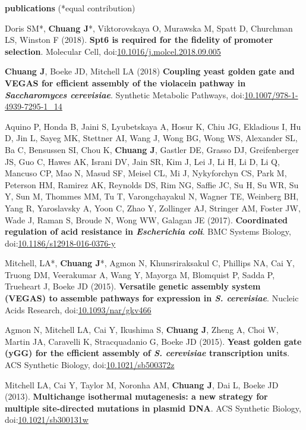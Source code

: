 \documentclass[11pt, a4paper]{article}
\begin{document}
\vspace{2em}
\textbf{\Large publications} (*equal contribution)
\begin{description}[topsep=2pt, align=right, leftmargin=!, labelwidth=\widthof{\textbf{2018}}]
    \item [2018] Doris SM*, \textbf{Chuang J}*, Viktorovskaya O, Murawska M, Spatt D, Churchman LS, Winston F (2018). \textbf{Spt6 is required for the fidelity of promoter selection}. Molecular Cell, doi:\href{https://doi.org/10.1016/j.molcel.2018.09.005}{10.1016/j.molcel.2018.09.005}
    \item [2018] \textbf{Chuang J}, Boeke JD, Mitchell LA (2018) \textbf{Coupling yeast golden gate and VEGAS for efficient assembly of the violacein pathway in \textit{Saccharomyces cerevisiae}}. Synthetic Metabolic Pathways, doi:\href{https://doi.org/10.1007/978-1-4939-7295-1_14}{10.1007/978-1-4939-7295-1\_14}
    \item [2017] Aquino P, Honda B, Jaini S, Lyubetskaya A, Hosur K, Chiu JG, Ekladious I, Hu D, Jin L, Sayeg MK, Stettner AI, Wang J, Wong BG, Wong WS, Alexander SL, Ba C, Bensussen SI, Chou K, \textbf{Chuang J}, Gastler DE, Grasso DJ, Greifenberger JS, Guo C, Hawes AK, Israni DV, Jain SR, Kim J, Lei J, Li H, Li D, Li Q, Mancuso CP, Mao N, Masud SF, Meisel CL, Mi J, Nykyforchyn CS, Park M, Peterson HM, Ramirez AK, Reynolds DS, Rim NG, Saffie JC, Su H, Su WR, Su Y, Sun M, Thommes MM, Tu T, Varongchayakul N, Wagner TE, Weinberg BH, Yang R, Yaroslavsky A, Yoon C, Zhao Y, Zollinger AJ, Stringer AM, Foster JW, Wade J, Raman S, Broude N, Wong WW, Galagan JE (2017). \textbf{Coordinated regulation of acid resistance in \textit{Escherichia coli}}. BMC Systems Biology, doi:\href{https://doi.org/10.1186/s12918-016-0376-y}{10.1186/s12918-016-0376-y}
    \item [2015] Mitchell, LA*, \textbf{Chuang J}*, Agmon N, Khunsriraksakul C, Phillips NA, Cai Y, Truong DM, Veerakumar A, Wang Y, Mayorga M, Blomquist P, Sadda P, Trueheart J, Boeke JD (2015). \textbf{Versatile genetic assembly system (VEGAS) to assemble pathways for expression in \textit{S. cerevisiae}}. Nucleic Acids Research, doi:\href{https://doi.org/10.1093/nar/gkv466}{10.1093/nar/gkv466}
    \item [2015] Agmon N, Mitchell LA, Cai Y, Ikushima S, \textbf{Chuang J}, Zheng A, Choi W, Martin JA, Caravelli K, Stracquadanio G, Boeke JD (2015). \textbf{Yeast golden gate (yGG) for the efficient assembly of \textit{S. cerevisiae} transcription units}. ACS Synthetic Biology, doi:\href{https://doi.org/10.1021/sb500372z}{10.1021/sb500372z}
    \item [2013] Mitchell LA, Cai Y, Taylor M, Noronha AM, \textbf{Chuang J}, Dai L, Boeke JD (2013). \textbf{Multichange isothermal mutagenesis: a new strategy for multiple site-directed mutations in plasmid DNA}. ACS Synthetic Biology, doi:\href{https://doi.org/10.1021/sb300131w}{10.1021/sb300131w}
\end{description}
\end{document}
